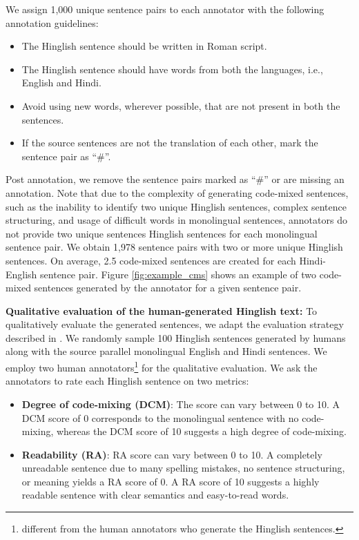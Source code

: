 \documentclass[11pt]{article}
\begin{document}
We assign 1,000 unique sentence pairs to each annotator with the following annotation guidelines: 
\begin{itemize}
    \item The Hinglish sentence should be written in Roman script.
    \item The Hinglish sentence should have words from both the languages, i.e., English and Hindi.
    \item Avoid using new words, wherever possible, that are not present in both the sentences. 
    \item If the source sentences are not the translation of each other, mark the sentence pair as ``\#''.
\end{itemize}

Post annotation, we remove the sentence pairs marked as ``\#'' or are missing an annotation. Note that due to the complexity of generating code-mixed sentences, such as the inability to identify two unique Hinglish sentences, complex sentence structuring, and usage of difficult words in monolingual sentences, annotators do not provide two unique sentences Hinglish sentences for each monolingual sentence pair. We obtain 1,978 sentence pairs with two or more unique Hinglish sentences.
On average, 2.5 code-mixed sentences are created for each Hindi-English sentence pair. Figure \ref{fig:example_cms} shows an example of two code-mixed sentences generated by the annotator for a given sentence pair.

\noindent\textbf{Qualitative evaluation of the human-generated Hinglish text:}
To qualitatively evaluate the generated sentences, we adapt the evaluation strategy described in \cite{srivastava2021challenges}. We randomly sample 100 Hinglish sentences generated by humans along with the source parallel monolingual English and Hindi sentences. We employ two human annotators\footnote{different from the human annotators who generate the Hinglish sentences.} for the qualitative evaluation. We ask the annotators to rate each Hinglish sentence on two metrics:
\begin{itemize}[noitemsep,nolistsep]
    \item \textbf{Degree of code-mixing (DCM)}: The score can vary between 0 to 10. A DCM score of 0 corresponds to the monolingual sentence with no code-mixing, whereas the DCM score of 10 suggests a high degree of code-mixing.
    \item \textbf{Readability (RA)}: RA score can vary between 0 to 10. A completely unreadable sentence due to many spelling mistakes, no sentence structuring, or meaning yields a RA score of 0. A RA score of 10 suggests a highly readable sentence with clear semantics and easy-to-read words.
\end{itemize}
\end{document}
